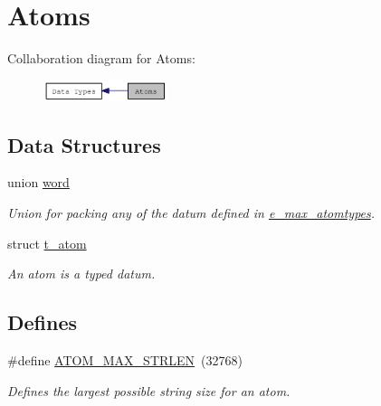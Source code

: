 \hypertarget{group__atom}{
\section{Atoms}
\label{group__atom}
}


Collaboration diagram for Atoms:\nopagebreak
\begin{figure}[H]
\begin{center}
\leavevmode
\includegraphics[width=103pt]{group__atom}
\end{center}
\end{figure}
\subsection*{Data Structures}
\begin{DoxyCompactItemize}
\item 
union \hyperlink{unionword}{word}
\begin{DoxyCompactList}\small\item\em Union for packing any of the datum defined in \hyperlink{group__atom_ga8aa6700e9f00b132eb376db6e39ade47}{e\_\-max\_\-atomtypes}. \item\end{DoxyCompactList}\item 
struct \hyperlink{structt__atom}{t\_\-atom}
\begin{DoxyCompactList}\small\item\em An atom is a typed datum. \item\end{DoxyCompactList}\end{DoxyCompactItemize}
\subsection*{Defines}
\begin{DoxyCompactItemize}
\item 
\hypertarget{group__atom_ga27eb80f98b4020e3ecab761d634a3876}{
\#define \hyperlink{group__atom_ga27eb80f98b4020e3ecab761d634a3876}{ATOM\_\-MAX\_\-STRLEN}~(32768)}
\label{group__atom_ga27eb80f98b4020e3ecab761d634a3876}

\begin{DoxyCompactList}\small\item\em Defines the largest possible string size for an atom. \item\end{DoxyCompactList}\end{DoxyCompactItemize}
